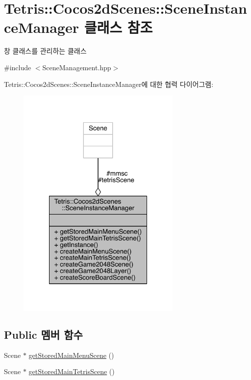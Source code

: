 \hypertarget{class_tetris_1_1_cocos2d_scenes_1_1_scene_instance_manager}{}\section{Tetris\+:\+:Cocos2d\+Scenes\+:\+:Scene\+Instance\+Manager 클래스 참조}
\label{class_tetris_1_1_cocos2d_scenes_1_1_scene_instance_manager}


창 클래스를 관리하는 클래스  




{\ttfamily \#include $<$Scene\+Management.\+hpp$>$}



Tetris\+:\+:Cocos2d\+Scenes\+:\+:Scene\+Instance\+Manager에 대한 협력 다이어그램\+:
\nopagebreak
\begin{figure}[H]
\begin{center}
\leavevmode
\includegraphics[width=228pt]{class_tetris_1_1_cocos2d_scenes_1_1_scene_instance_manager__coll__graph}
\end{center}
\end{figure}
\subsection*{Public 멤버 함수}
\begin{DoxyCompactItemize}
\item 
Scene $\ast$ \hyperlink{class_tetris_1_1_cocos2d_scenes_1_1_scene_instance_manager_ac7f573b16a4fd8746fd1f397dbfd01c2}{get\+Stored\+Main\+Menu\+Scene} ()
\item 
Scene $\ast$ \hyperlink{class_tetris_1_1_cocos2d_scenes_1_1_scene_instance_manager_af79d0ad920411ed2b87545b49bc32e6c}{get\+Stored\+Main\+Tetris\+Scene} ()
\end{DoxyCompactItemize}
